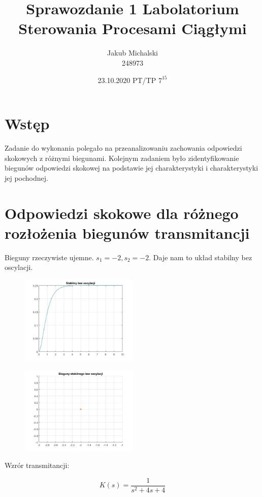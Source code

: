 \documentclass{article}
\title{Sprawozdanie 1 Labolatorium Sterowania Procesami Ciągłymi }
\author{Jakub Michalski \\ 248973}
\date{23.10.2020 PT/TP $7^{15}$}
\begin{document}
\maketitle

\section{Wstęp}
Zadanie do wykonania polegało na przeanalizowaniu zachowania odpowiedzi skokowych z różnymi biegunami. Kolejnym zadaniem było zidentyfikowanie biegunów odpowiedzi skokowej na podstawie jej charakterystyki i charakterystyki jej pochodnej.

\section{Odpowiedzi skokowe dla różnego rozłożenia biegunów transmitancji}

Bieguny rzeczywiste ujemne. $s_1 = -2 , s_2 = -2$. Daje nam to układ stabilny bez oscylacji.

\begin{figure}
    \centering
    \includegraphics[width=0.5\textwidth]{stabbezosc.jpg}
\end{figure}
\begin{figure}
    \centering
    \includegraphics[width=0.5\textwidth]{biegstabbezosc.jpg}
\end{figure}
Wzrór transmitancji:

$$ K(s) =\frac{1}{s^2+4s+4} $$
\newpage
\end{document}
